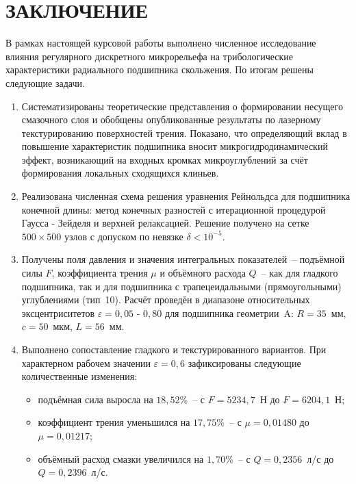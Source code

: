 \section*{ЗАКЛЮЧЕНИЕ}
{}

В рамках настоящей курсовой работы выполнено численное исследование влияния регулярного дискретного микрорельефа на трибологические характеристики радиального подшипника скольжения. По итогам решены следующие задачи.

\begin{enumerate}
    \item Систематизированы теоретические представления о формировании несущего смазочного слоя и обобщены опубликованные результаты по лазерному текстурированию поверхностей трения. Показано, что определяющий вклад в повышение характеристик подшипника вносит микрогидродинамический эффект, возникающий на входных кромках микроуглублений за счёт формирования локальных сходящихся клиньев.

    \item Реализована численная схема решения уравнения Рейнольдса для подшипника конечной длины: метод конечных разностей с итерационной процедурой Гаусса - Зейделя и верхней релаксацией. Решение получено на сетке $500 \times 500$ узлов с допуском по невязке $\delta < 10^{-5}$.

    \item Получены поля давления и значения интегральных показателей~-- подъёмной силы $F$, коэффициента трения $\mu$ и объёмного расхода $Q$~-- как для гладкого подшипника, так и для подшипника с трапецеидальными (прямоугольными) углублениями (тип~10). Расчёт проведён в диапазоне относительных эксцентриситетов $\varepsilon = 0{,}05\text{ - }0{,}80$ для подшипника геометрии~A: $R = 35$~мм, $c = 50$~мкм, $L = 56$~мм.

    \item Выполнено сопоставление гладкого и текстурированного вариантов. При характерном рабочем значении $\varepsilon = 0{,}6$ зафиксированы следующие количественные изменения:
    \begin{itemize}
        \item подъёмная сила выросла на $18{,}52$\%~-- с $F = 5234{,}7$~Н до $F = 6204{,}1$~Н;
        \item коэффициент трения уменьшился на $17{,}75$\%~-- с $\mu = 0{,}01480$ до $\mu = 0{,}01217$;
        \item объёмный расход смазки увеличился на $1{,}70$\%~-- с $Q = 0{,}2356$~л/с до $Q = 0{,}2396$~л/с.
    \end{itemize}
\end{enumerate}

